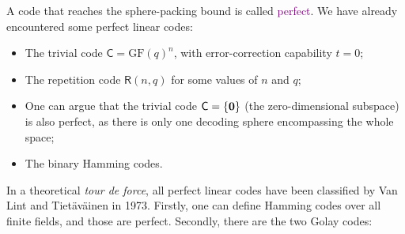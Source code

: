 \documentclass[a4paper, 11pt, openany]{book}
\numberwithin{equation}{section}
\theoremstyle{plain}
\theoremstyle{definition}
\newcommand{\GF}{\mathrm{GF}}
\newcommand{\Define}[1]{\textcolor{purple}{#1}}
\newcommand{\code}[1]{\mathsf{#1}}
\newcommand{\Repetition}            {\code{R}}
\begin{document}
A code that reaches the sphere-packing bound is called \Define{perfect}. We have already encountered some perfect linear codes:
\begin{itemize}
    \item The trivial code $\code{C} = \GF(q)^n$, with error-correction capability $t = 0$;
    
    \item The repetition code $\Repetition(n,q)$ for some values of $n$ and $q$;
    
    \item One can argue that the trivial code $\code{C} = \{ {\bf 0} \}$ (the zero-dimensional subspace) is also perfect, as there is only one decoding sphere encompassing the whole space;
    
    \item The binary Hamming codes.
\end{itemize}
In a theoretical \textit{tour de force}, all perfect linear codes have been classified by Van Lint and Tiet\"av\"ainen in 1973. Firstly, one can define Hamming codes over all finite fields, and those are perfect. Secondly, there are the two Golay codes:
\end{document}
